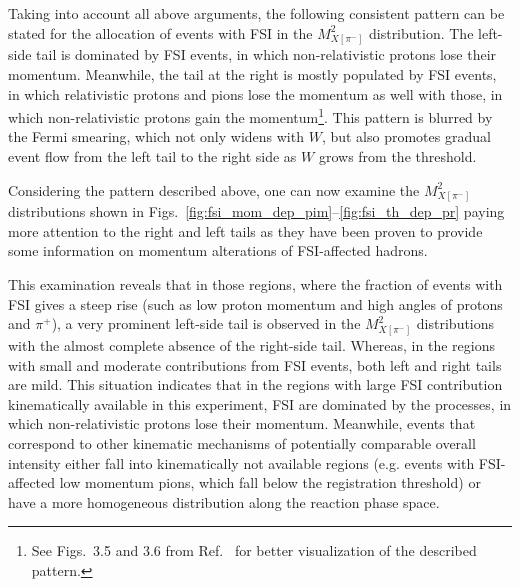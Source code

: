 Taking into account all above arguments, the following consistent pattern can be stated for the allocation of events with FSI in the $M^{2}_{X[\pi^{-}]}$ distribution. The left-side tail is dominated by FSI events, in which non-relativistic protons lose their momentum. Meanwhile, the tail at the right is mostly populated by FSI events, in which relativistic protons and pions lose the momentum as well with those, in which non-relativistic protons gain the momentum\footnote[8]{See Figs.~3.5 and 3.6 from Ref.~\cite{note_mm_distr} for better visualization of the described pattern.}. This pattern is blurred by the Fermi smearing, which not only widens with $W$, but also promotes gradual event flow from the left tail to the right side as $W$ grows from the threshold.







Considering the pattern described above, one can now examine the $M^{2}_{X[\pi^{-}]}$ distributions shown in Figs.~\ref{fig:fsi_mom_dep_pim}--\ref{fig:fsi_th_dep_pr} paying more attention to the right and left tails as they have been proven to provide some information on momentum alterations of FSI-affected hadrons.

This examination reveals that in those regions, where the fraction of events with FSI gives a steep rise (such as low proton momentum and high angles of protons and $\pi^{+}$), a very prominent left-side tail is observed in the $M^{2}_{X[\pi^{-}]}$ distributions with the almost complete absence of the right-side tail. Whereas, in the regions with small and moderate contributions from FSI events, both left and right tails are mild. This situation indicates that in the regions with large FSI contribution kinematically available in this experiment, FSI are dominated by the processes, in which non-relativistic protons lose their momentum. Meanwhile, events that correspond to other kinematic mechanisms of potentially comparable overall intensity either fall into kinematically not available regions (e.g. events with FSI-affected low momentum pions, which fall below the registration threshold) or have a more homogeneous distribution along the reaction phase space. 



